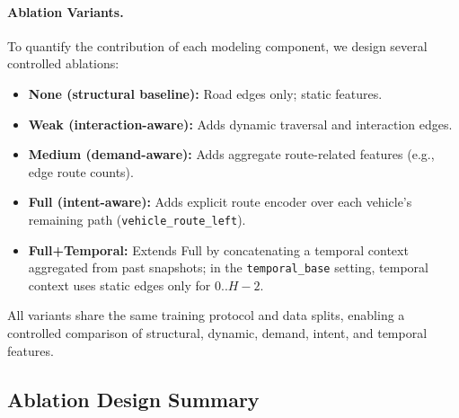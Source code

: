 \paragraph{Ablation Variants.}
To quantify the contribution of each modeling component, we design several controlled ablations:
\begin{itemize}
    \item \textbf{None (structural baseline):} Road edges only; static features.
    \item \textbf{Weak (interaction-aware):} Adds dynamic traversal and interaction edges.
    \item \textbf{Medium (demand-aware):} Adds aggregate route-related features (e.g., edge route counts).
    \item \textbf{Full (intent-aware):} Adds explicit route encoder over each vehicle's remaining path (\texttt{vehicle\_route\_left}).
    \item \textbf{Full+Temporal:} Extends Full by concatenating a temporal context aggregated from past snapshots; in the \texttt{temporal\_base} setting, temporal context uses static edges only for $0..H{-}2$.
\end{itemize}
All variants share the same training protocol and data splits, enabling a controlled comparison of structural, dynamic, demand, intent, and temporal features.

\subsection{Ablation Design Summary}
\begin{table}[t]
    \centering
    \caption{Ablation Study Variants and Configurations}
    \label{tab:ablation_variants}
\end{table}

